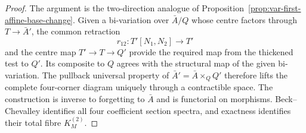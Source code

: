 \begin{proof}
The argument is the two-direction analogue of Proposition~\ref{prop:var-first-affine-base-change}. Given a bi-variation over \(\bar A/Q\) whose centre factors through \(T\to\bar A'\), the common retraction
\[
    r_{12}:T'[N_1,N_2]\longrightarrow T'
\]
and the centre map \(T'\to T\to Q'\) provide the required map from the thickened test to \(Q'\). Its composite to \(Q\) agrees with the structural map of the given bi-variation. The pullback universal property of \(\bar A'=\bar A\times_QQ'\) therefore lifts the complete four-corner diagram uniquely through a contractible space. The construction is inverse to forgetting to \(\bar A\) and is functorial on morphisms. Beck--Chevalley identifies all four coefficient section spectra, and exactness identifies their total fibre \(K_M^{(2)}\).
\end{proof}

